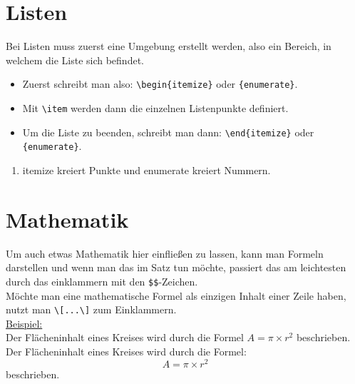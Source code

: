 \documentclass{report}
\begin{document}
\section*{Listen}
Bei Listen muss zuerst eine Umgebung erstellt werden, also ein Bereich, in welchem die Liste sich befindet.
\begin{itemize}
    \item Zuerst schreibt man also: {\color{blue}\verb|\begin{itemize}|} oder {\color{blue}\verb|{enumerate}|}.
    \item Mit {\color{blue}\verb|\item|} werden dann die einzelnen Listenpunkte definiert.
    \item Um die Liste zu beenden, schreibt man dann: {\color{blue}\verb|\end{itemize}|} oder {\color{blue}\verb|{enumerate}|}.
\end{itemize}
\begin{enumerate}
    \item {\color{blue}itemize} kreiert Punkte und {\color{blue}enumerate} kreiert Nummern.
\end{enumerate}

\section*{Mathematik}
Um auch etwas Mathematik hier einfließen zu lassen, kann man Formeln darstellen und wenn man das im Satz tun möchte, passiert das am leichtesten durch das einklammern mit den {\color{blue}\verb|$$|}-Zeichen.\\ Möchte man eine mathematische Formel als einzigen Inhalt einer Zeile haben, nutzt man {\color{blue}\verb|\[...\]|} zum Einklammern.\\
\underline{Beispiel:}\\
Der Flächeninhalt eines Kreises wird durch die Formel $A=\pi×r^2$ beschrieben.\\
Der Flächeninhalt eines Kreises wird durch die Formel:
\[A=\pi×r^2\] beschrieben.
\end{document}
